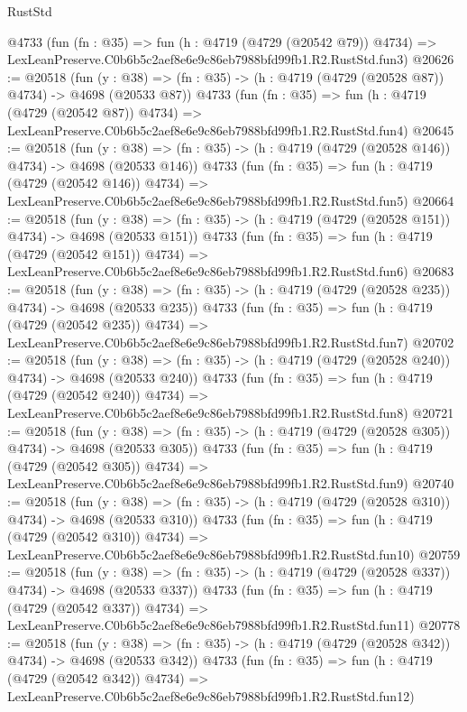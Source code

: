 \begin{lexlean}{RustStd}
\begin{coremodule}
    @4733
    (fun (fn : @35) =>
    fun (h : @4719 (@4729 (@20542 @79)) @4734) =>
    LexLeanPreserve.C0b6b5c2aef8e6e9c86eb7988bfd99fb1.R2.RustStd.fun3)
@20626 := @20518
    (fun (y : @38) => (fn : @35) -> (h : @4719 (@4729 (@20528 @87)) @4734) -> @4698 (@20533 @87))
    @4733
    (fun (fn : @35) =>
    fun (h : @4719 (@4729 (@20542 @87)) @4734) =>
    LexLeanPreserve.C0b6b5c2aef8e6e9c86eb7988bfd99fb1.R2.RustStd.fun4)
@20645 := @20518
    (fun (y : @38) => (fn : @35) -> (h : @4719 (@4729 (@20528 @146)) @4734) -> @4698 (@20533 @146))
    @4733
    (fun (fn : @35) =>
    fun (h : @4719 (@4729 (@20542 @146)) @4734) =>
    LexLeanPreserve.C0b6b5c2aef8e6e9c86eb7988bfd99fb1.R2.RustStd.fun5)
@20664 := @20518
    (fun (y : @38) => (fn : @35) -> (h : @4719 (@4729 (@20528 @151)) @4734) -> @4698 (@20533 @151))
    @4733
    (fun (fn : @35) =>
    fun (h : @4719 (@4729 (@20542 @151)) @4734) =>
    LexLeanPreserve.C0b6b5c2aef8e6e9c86eb7988bfd99fb1.R2.RustStd.fun6)
@20683 := @20518
    (fun (y : @38) => (fn : @35) -> (h : @4719 (@4729 (@20528 @235)) @4734) -> @4698 (@20533 @235))
    @4733
    (fun (fn : @35) =>
    fun (h : @4719 (@4729 (@20542 @235)) @4734) =>
    LexLeanPreserve.C0b6b5c2aef8e6e9c86eb7988bfd99fb1.R2.RustStd.fun7)
@20702 := @20518
    (fun (y : @38) => (fn : @35) -> (h : @4719 (@4729 (@20528 @240)) @4734) -> @4698 (@20533 @240))
    @4733
    (fun (fn : @35) =>
    fun (h : @4719 (@4729 (@20542 @240)) @4734) =>
    LexLeanPreserve.C0b6b5c2aef8e6e9c86eb7988bfd99fb1.R2.RustStd.fun8)
@20721 := @20518
    (fun (y : @38) => (fn : @35) -> (h : @4719 (@4729 (@20528 @305)) @4734) -> @4698 (@20533 @305))
    @4733
    (fun (fn : @35) =>
    fun (h : @4719 (@4729 (@20542 @305)) @4734) =>
    LexLeanPreserve.C0b6b5c2aef8e6e9c86eb7988bfd99fb1.R2.RustStd.fun9)
@20740 := @20518
    (fun (y : @38) => (fn : @35) -> (h : @4719 (@4729 (@20528 @310)) @4734) -> @4698 (@20533 @310))
    @4733
    (fun (fn : @35) =>
    fun (h : @4719 (@4729 (@20542 @310)) @4734) =>
    LexLeanPreserve.C0b6b5c2aef8e6e9c86eb7988bfd99fb1.R2.RustStd.fun10)
@20759 := @20518
    (fun (y : @38) => (fn : @35) -> (h : @4719 (@4729 (@20528 @337)) @4734) -> @4698 (@20533 @337))
    @4733
    (fun (fn : @35) =>
    fun (h : @4719 (@4729 (@20542 @337)) @4734) =>
    LexLeanPreserve.C0b6b5c2aef8e6e9c86eb7988bfd99fb1.R2.RustStd.fun11)
@20778 := @20518
    (fun (y : @38) => (fn : @35) -> (h : @4719 (@4729 (@20528 @342)) @4734) -> @4698 (@20533 @342))
    @4733
    (fun (fn : @35) =>
    fun (h : @4719 (@4729 (@20542 @342)) @4734) =>
    LexLeanPreserve.C0b6b5c2aef8e6e9c86eb7988bfd99fb1.R2.RustStd.fun12)

\end{coremodule}
\end{lexlean}
